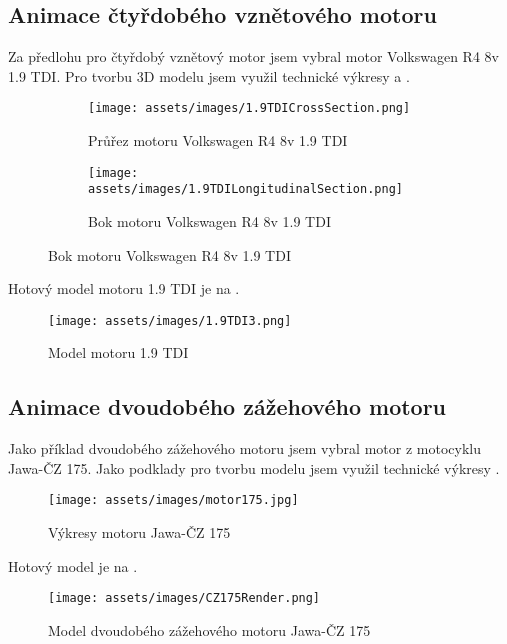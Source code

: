 \subsection{Animace čtyřdobého vznětového motoru}
{Za předlohu pro čtyřdobý vznětový motor jsem vybral motor Volkswagen R4 8v 1.9 TDI. Pro tvorbu 3D modelu jsem využil technické výkresy  a .}
\begin{figure}[H]
    \begingroup
    \makeatletter
    \renewcommand\thesubfigure{\thefigure~--~\@nameuse{subfiglabel@\alph{subfigure}}}
    \newcommand{\subfiglabel@a}{vlevo}
    \newcommand{\subfiglabel@b}{vpravo}
    \captionsetup[subfigure]{labelformat=simple, labelsep=colon}
    \renewcommand\p@subfigure{}
    \makeatother
    \centering
    \begin{subfigure}{.48\textwidth}
        \centering
        \texttt{[image: assets/images/1.9TDICrossSection.png]}
        \caption{Průřez motoru Volkswagen R4 8v 1.9 TDI \cite{VWGAG:RealizingFutureTrendsInDieselEngineDevelopment}}
        \label{obr:1.9TDIvykresyPrurez}
    \end{subfigure}\hfill
    \begin{subfigure}{.48\textwidth}
        \centering
        \texttt{[image: assets/images/1.9TDILongitudinalSection.png]}
        \caption{Bok motoru Volkswagen R4 8v 1.9 TDI \cite{VWGAG:RealizingFutureTrendsInDieselEngineDevelopment}}
        \label{obr:1.9TDIvykresyBok}
    \end{subfigure}
    \endgroup
\end{figure}
{Hotový model motoru 1.9 TDI je na .}
\begin{figure}[H]
    \centering
    \texttt{[image: assets/images/1.9TDI3.png]}
    \caption{Model motoru 1.9 TDI \jaObr}
    \label{obr:1.9TDImodel}
\end{figure}
\newpage
\subsection{Animace dvoudobého zážehového motoru}
{Jako příklad dvoudobého zážehového motoru jsem vybral motor z motocyklu Jawa-ČZ 175. Jako podklady pro tvorbu modelu jsem využil technické výkresy .}
\begin{figure}[H]
    \centering
    \texttt{[image: assets/images/motor175.jpg]}
    \caption{Výkresy motoru Jawa-ČZ 175 \cite{MZ:CZ175}}
    \label{obr:CZ175Vykres}
\end{figure}
{Hotový model je na .}
\begin{figure}[H]
    \centering
    \texttt{[image: assets/images/CZ175Render.png]}
    \caption{Model dvoudobého zážehového motoru Jawa-ČZ 175 \jaObr}
    \label{obr:CZ175Render}
\end{figure}
\newpage
